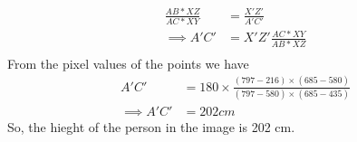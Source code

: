 \documentclass[a4paper]{article}
\begin{document}
\begin{equation*}
\begin{split}
\frac{AB*XZ}{AC*XY} &= \frac{X'Z'}{A'C'} \\
\implies A'C' &= X'Z' \frac{AC*XY}{AB*XZ} \\
\end{split}
\end{equation*}
From the pixel values of the points we have  
\begin{equation*}
\begin{split}
A'C' &= 180\times\frac{(797-216)\times(685-580)}{(797-580)\times(685-435)} \\
\implies A'C' &= 202 cm
\end{split}
\end{equation*}
So, the hieght of the person in the image is 202 cm.


\hrulefill \\
\end{document}

